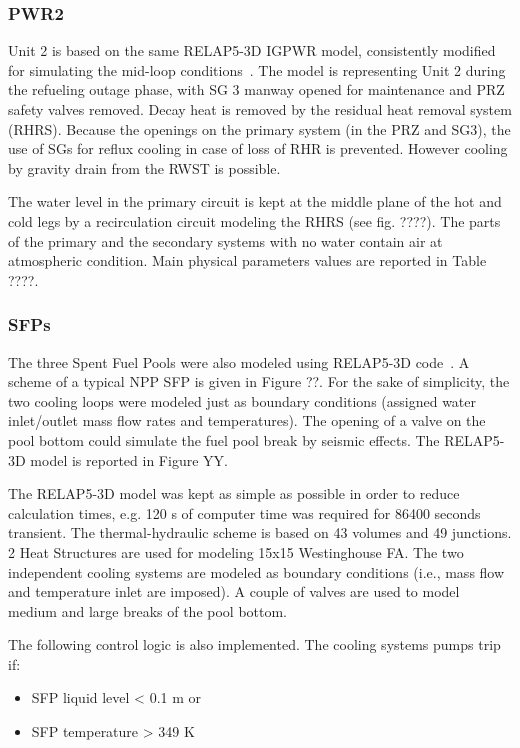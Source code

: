 \subsubsection{PWR2}
Unit 2 is based on the same RELAP5-3D IGPWR model, consistently modified for simulating the 
mid-loop conditions~\cite{NUREGCR6144}. The model is representing Unit 2 
during the refueling outage phase, with SG 3 manway opened for maintenance and PRZ safety 
valves removed. Decay heat is removed by the residual heat removal system (RHRS). Because the 
openings on the primary system (in the PRZ and SG3), the use of SGs for reflux cooling in case 
of loss of RHR is prevented. However cooling by gravity drain from the RWST is possible.

The water level in the primary circuit is kept at the middle plane of the hot and cold legs 
by a recirculation circuit modeling the RHRS (see fig. ????). 
The parts of the primary and the secondary systems with no water contain air at atmospheric condition.  
Main physical parameters values are reported in Table ????.

\subsubsection{SFPs}
The three Spent Fuel Pools were also modeled using RELAP5-3D code~\cite{parisiExternalAnalysis}. 
A scheme of a typical 
NPP SFP is given in Figure ??. 
For the sake of simplicity, the two cooling loops were modeled just as boundary conditions 
(assigned water inlet/outlet mass flow rates and temperatures). The opening of a valve on the pool bottom
could simulate the fuel pool break by seismic effects. The RELAP5-3D model is reported in Figure YY.

The RELAP5-3D model was kept as simple as possible in order to reduce calculation times, e.g. 120 s 
of computer time was required for 86400 seconds transient. The thermal-hydraulic scheme is based on
43 volumes and 49 junctions. 2 Heat Structures are used for modeling 15x15 Westinghouse FA. 
The two independent cooling systems are modeled as boundary conditions (i.e., mass flow and temperature inlet are imposed). A couple of valves are used to model medium and large breaks of the pool bottom.

The following control logic is also implemented. The cooling systems pumps trip if: 
\begin{itemize}
  \item SFP liquid level < 0.1 m or
  \item SFP temperature > 349 K
\end{itemize}

